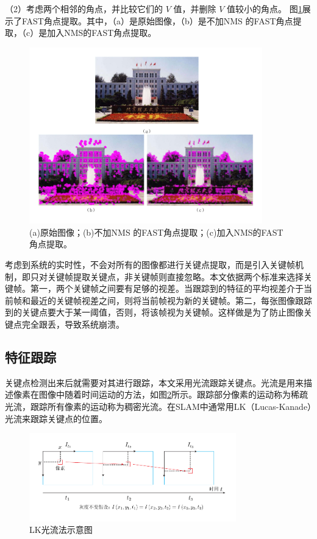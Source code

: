 （2）考虑两个相邻的角点，并比较它们的 $V$ 值，并删除 $V$ 值较小的角点。
图\ref{fig3_2}展示了FAST角点提取。其中，（a）是原始图像，（b）是不加NMS 的FAST角点提取，（c）是加入NMS的FAST角点提取。
\begin{figure}[h]\setlength{\belowcaptionskip}{-12pt}
	\centering
	\includegraphics[width=0.9\textwidth]{figures/chapter3/fig3_2}
	\caption{(a)原始图像；(b)不加NMS 的FAST角点提取；(c)加入NMS的FAST角点提取。}\label{fig3_2}
\end{figure}

考虑到系统的实时性，不会对所有的图像都进行关键点提取，而是引入关键帧机制，即只对关键帧提取关键点，非关键帧则直接忽略。本文依据两个标准来选择关键帧。第一，两个关键帧之间要有足够的视差。当跟踪到的特征的平均视差介于当前帧和最近的关键帧视差之间，则将当前帧视为新的关键帧。第二，每张图像跟踪到的关键点要大于某一阈值，否则，将该帧视为关键帧。这样做是为了防止图像关键点完全跟丢，导致系统崩溃。
\subsection{特征跟踪}
关键点检测出来后就需要对其进行跟踪，本文采用光流跟踪关键点。光流是用来描述像素在图像中随着时间运动的方法，如图\ref{fig3_3}所示。跟踪部分像素的运动称为稀疏光流，跟踪所有像素的运动称为稠密光流。在SLAM中通常用LK（Lucas-Kanade）光流来跟踪关键点的位置。
\begin{figure}[h]\setlength{\belowcaptionskip}{-12pt}
	\centering
	\includegraphics[width=0.8\textwidth]{figures/chapter3/fig3_3}
	\caption{LK光流法示意图}\label{fig3_3}
\end{figure}

